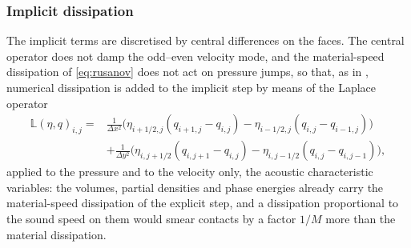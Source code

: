 \subsubsection{Implicit dissipation}
\label{sec:dissipation}
The implicit terms are discretised by central differences on the faces. The central operator does not damp the
odd--even velocity mode, and the material-speed dissipation of \eqref{eq:rusanov} does not act on pressure jumps, so that,
as in \cite{DumbserCasulli2016,BoscheriPareschi2021}, numerical dissipation is added to the implicit step by means of the Laplace operator
\begin{equation}
\begin{aligned}
\mathbb L(\eta,q)_{i,j}=&\frac1{\Delta x^2}\Big(\eta_{i+1/2,j}(q_{i+1,j}-q_{i,j})-\eta_{i-1/2,j}(q_{i,j}-q_{i-1,j})\Big)\\
&+\frac1{\Delta y^2}\Big(\eta_{i,j+1/2}(q_{i,j+1}-q_{i,j})-\eta_{i,j-1/2}(q_{i,j}-q_{i,j-1})\Big),
\end{aligned}
\label{eq:laplace}
\end{equation}
applied to the pressure and to the velocity only, the acoustic characteristic variables: the volumes, partial densities and
phase energies already carry the material-speed dissipation of the explicit step, and a dissipation proportional to the
sound speed on them would smear contacts by a factor $1/M$ more than the material dissipation.


